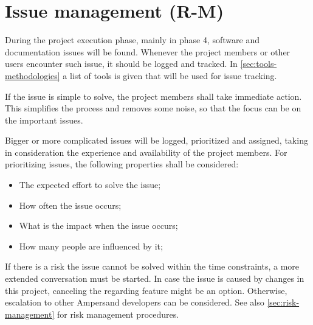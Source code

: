 
\section{Issue management (R-M)}
\label{sec:issue-management}
During the project execution phase, mainly in phase 4, software and documentation issues will be found.
Whenever the project members or other users encounter such issue, it should be logged and tracked.
In \autoref{sec:tools-methodologies} a list of tools is given that will be used for issue tracking.

If the issue is simple to solve, the project members shall take immediate action.
This simplifies the process and removes some noise, so that the focus can be on the important issues.

Bigger or more complicated issues will be logged, prioritized and assigned, taking in consideration the experience and availability of the project members.
For prioritizing issues, the following properties shall be considered:
\begin{itemize}
	\item The expected effort to solve the issue;
	\item How often the issue occurs;
	\item What is the impact when the issue occurs;
	\item How many people are influenced by it;
\end{itemize}

If there is a risk the issue cannot be solved within the time constraints, a more extended conversation must be started.
In case the issue is caused by changes in this project, canceling the regarding feature might be an option.
Otherwise, escalation to other Ampersand developers can be considered.
See also \autoref{sec:risk-management} for risk management procedures.